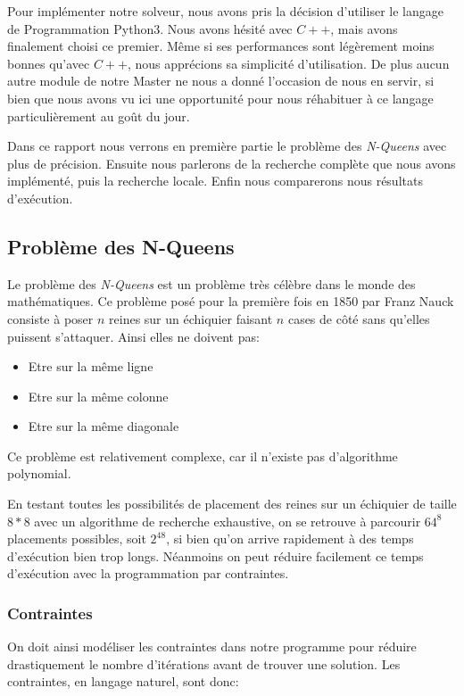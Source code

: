 \documentclass{article}
\begin{document}
Pour implémenter notre solveur, nous avons pris la décision d'utiliser le langage de Programmation Python3. Nous avons hésité avec $C++$, mais avons finalement choisi ce premier. Même si ses performances sont légèrement moins bonnes qu'avec $C++$, nous apprécions sa simplicité d’utilisation. De plus aucun autre module de notre Master ne nous a donné l’occasion de nous en servir, si bien que nous avons vu ici une opportunité pour nous réhabituer à ce langage particulièrement au goût du jour.

Dans ce rapport nous verrons en première partie le problème des \emph{N-Queens} avec plus de précision. Ensuite nous parlerons de la recherche complète que nous avons implémenté, puis la recherche locale. Enfin nous comparerons nous résultats d'exécution. 


\vspace{1cm}

\subsection{Problème des N-Queens}

Le problème des \emph{N-Queens} est un problème très célèbre dans le monde des mathématiques. Ce problème posé pour la première fois en 1850 par Franz Nauck consiste à poser $n$ reines sur un échiquier faisant $n$ cases de côté sans qu'elles puissent s'attaquer. Ainsi elles ne doivent pas: 
\begin{itemize}
\item Etre sur la même ligne
\item Etre sur la même colonne
\item Etre sur la même diagonale
\end{itemize}

Ce problème est relativement complexe, car il n'existe pas d'algorithme polynomial.


En testant toutes les possibilités de placement des reines sur un échiquier de taille $8*8$ avec un algorithme de recherche exhaustive, on se retrouve à parcourir $64^8$ placements possibles, soit $2^{48}$, si bien qu'on arrive rapidement à des temps d'exécution bien trop longs. Néanmoins on peut réduire facilement ce temps d'exécution avec la programmation par contraintes. 


\subsubsection{Contraintes}

On doit ainsi modéliser les contraintes dans notre programme pour réduire drastiquement le nombre d'itérations avant de trouver une solution. Les contraintes, en langage naturel, sont donc:
\end{document}
